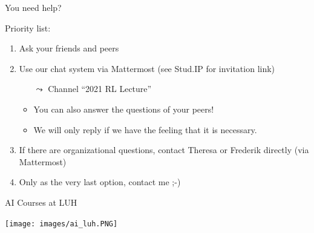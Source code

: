 \documentclass[aspectratio=169]{../latex_main/tntbeamer}  %
\begin{document}
\begin{frame}[c]{You need help?}
	
Priority list:
	\begin{enumerate}
		\item Ask your friends and peers
		\item Use our chat system via Mattermost (see Stud.IP for invitation link)
		\begin{itemize}
		    \item[$\leadsto$] Channel ``2021 RL Lecture''
			\item You can also answer the questions of your peers! 
			\item We will only reply if we have the feeling that it is necessary.
		\end{itemize}
		\item If there are organizational questions, contact Theresa or Frederik directly (via Mattermost)
		\item Only as the very last option, contact me ;-)
	\end{enumerate}
	
\end{frame}
\begin{frame}{AI Courses at LUH}
    
    \centering
    \texttt{[image: images/ai\_luh.PNG]}

\end{frame}
\end{document}
